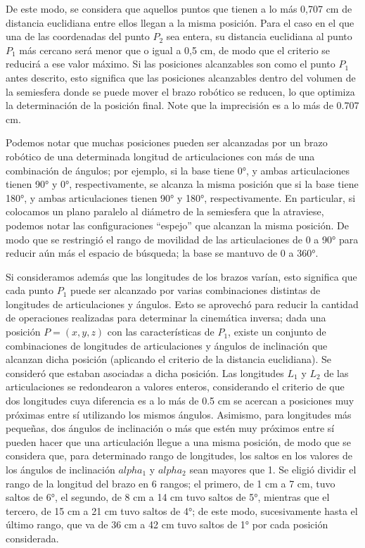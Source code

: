 De este modo, se considera que aquellos puntos que tienen a lo más 0,707 cm de distancia euclidiana entre ellos llegan a la misma posición. Para el caso en el que una de las coordenadas del punto $P_2$ sea entera, su distancia euclidiana al punto $P_1$ más cercano será menor que o igual a 0,5 cm, de modo que el criterio se reducirá a ese valor máximo. Si las posiciones alcanzables son como el punto $P_1$ antes descrito, esto significa que las posiciones alcanzables dentro del volumen de la semiesfera donde se puede mover el brazo robótico se reducen, lo que optimiza la determinación de la posición final. Note que la imprecisión es a lo más de 0.707 cm. 

Podemos notar que muchas posiciones pueden ser alcanzadas por un brazo robótico de una determinada longitud de articulaciones con más de una combinación de ángulos; por ejemplo, si la base tiene 0°, y ambas articulaciones tienen 90° y 0°, respectivamente, se alcanza la misma posición que si la base tiene 180°, y ambas articulaciones tienen 90° y 180°, respectivamente. En particular, si colocamos un plano paralelo al diámetro de la semiesfera que la atraviese, podemos notar las configuraciones ``espejo'' que alcanzan la misma posición. De modo que se restringió el rango de movilidad de las articulaciones de 0 a 90° para reducir aún más el espacio de búsqueda; la base se mantuvo de 0 a 360°. 

Si consideramos además que las longitudes de los brazos varían, esto significa que cada punto $P_1$ puede ser alcanzado por varias combinaciones distintas de longitudes de articulaciones y ángulos. Esto se aprovechó para reducir la cantidad de operaciones realizadas para determinar la cinemática inversa; dada una posición $P = (x,y,z)$ con las características de $P_1$, existe un conjunto de combinaciones de longitudes de articulaciones y ángulos de inclinación que alcanzan dicha posición (aplicando el criterio de la distancia euclidiana). Se consideró que estaban asociadas a dicha posición. Las longitudes $L_1$ y $L_2$ de las articulaciones se redondearon a valores enteros, considerando el criterio de que dos longitudes cuya diferencia es a lo más de 0.5 cm se acercan a posiciones muy próximas entre sí utilizando los mismos ángulos. Asimismo, para longitudes más pequeñas, dos ángulos de inclinación o más que estén muy próximos entre sí pueden hacer que una articulación llegue a una misma posición, de modo que se considera que, para determinado rango de longitudes, los saltos en los valores de los ángulos de inclinación $alpha_1$ y $alpha_2$ sean mayores que 1. Se eligió dividir el rango de la longitud del brazo en 6 rangos; el primero, de 1 cm a 7 cm, tuvo saltos de 6°, el segundo, de 8 cm a 14 cm tuvo saltos de 5°, mientras que el tercero, de 15 cm a 21 cm tuvo saltos de 4°; de este modo, sucesivamente hasta el último rango, que va de 36 cm a 42 cm tuvo saltos de 1° por cada posición considerada.

